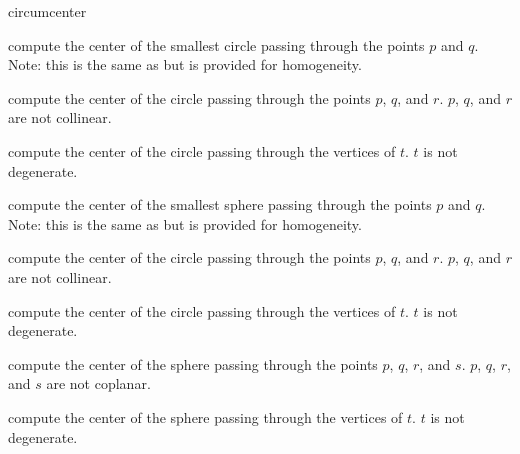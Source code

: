 \begin{ccRefFunction}{circumcenter}

 {compute the center of the smallest circle passing through the points $p$ and
  $q$.  Note: this is the same as  but is provided
  for homogeneity. }

 {compute the center of the circle passing through the points $p$, $q$, and $r$.
  \ccPrecond $p$, $q$, and $r$ are not collinear.}

 {compute the center of the circle passing through the vertices of $t$.
  \ccPrecond $t$ is not degenerate.}


 {compute the center of the smallest sphere passing through the points $p$ and
  $q$.  Note: this is the same as  but is provided
  for homogeneity. }

 {compute the center of the circle passing through the points $p$, $q$, and $r$.
  \ccPrecond $p$, $q$, and $r$ are not collinear.}

 {compute the center of the circle passing through the vertices of $t$.
  \ccPrecond $t$ is not degenerate.}

 {compute the center of the sphere passing through the points $p$, $q$, $r$, and $s$.
  \ccPrecond $p$, $q$, $r$, and $s$ are not coplanar.}

 {compute the center of the sphere passing through the vertices of $t$.
  \ccPrecond $t$ is not degenerate.}

\end{ccRefFunction}

